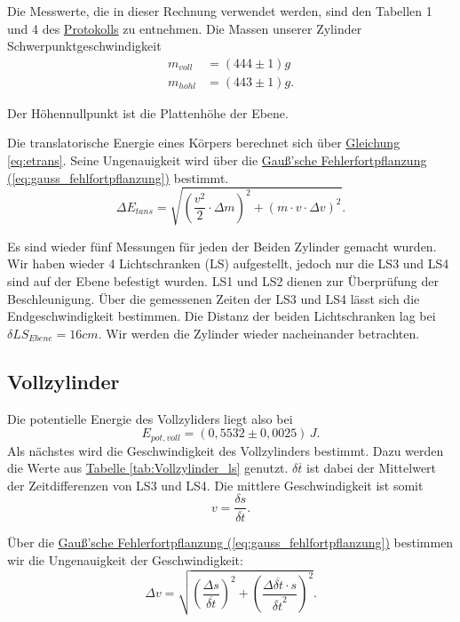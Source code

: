 Die Messwerte, die in dieser Rechnung verwendet werden, sind den Tabellen 1 und 4 des \hyperref[Protokoll]{Protokolls} zu entnehmen. Die Massen unserer Zylinder Schwerpunktgeschwindigkeit
\begin{align}
    m_{voll} &= (444 \pm 1) g \\
    m_{hohl} &= (443 \pm 1) g.
\end{align}



Der Höhennullpunkt ist die Plattenhöhe der Ebene.

Die translatorische Energie eines Körpers berechnet sich über \hyperref[eq:etrans]{Gleichung \ref*{eq:etrans}}. Seine Ungenauigkeit wird über die \hyperref[eq:gauss_fehlfortpflanzung]{Gauß'sche Fehlerfortpflanzung (\ref*{eq:gauss_fehlfortpflanzung})} bestimmt.
\begin{equation}
    \Delta E_{tans} = \sqrt{\left(\frac{v^2}{2} \cdot \Delta m\right)^2 + \left(m\cdot v \cdot \Delta v \right)^2}.
\end{equation}

Es sind wieder fünf Messungen für jeden der Beiden Zylinder gemacht wurden. Wir haben wieder 4 Lichtschranken (LS) aufgestellt, jedoch nur die LS3 und LS4 sind auf der Ebene befestigt wurden. LS1 und LS2 dienen zur Überprüfung der Beschleunigung. Über die gemessenen Zeiten der LS3 und LS4 lässt sich die Endgeschwindigkeit bestimmen. Die Distanz der beiden Lichtschranken lag bei $\delta LS_{Ebene} = 16 cm$. Wir werden die Zylinder wieder nacheinander betrachten.

\subsection*{Vollzylinder}
Die potentielle Energie des Vollzyliders liegt also bei 
\begin{equation}
\boxed{
    E_{pot,voll} = (0,5532 \pm 0,0025)\, J
}.
\end{equation}
Als nächstes wird die Geschwindigkeit des Vollzylinders bestimmt. Dazu werden die Werte aus \hyperref[tab:Vollzylinder_ls]{Tabelle \ref*{tab:Vollzylinder_ls}} genutzt. $\delta\overline{t}$ ist dabei der Mittelwert der Zeitdifferenzen von LS3 und LS4. Die mittlere Geschwindigkeit ist somit
\begin{equation}
    v = \frac{\delta s}{\overline{\delta t}}.
\end{equation}

Über die \hyperref[eq:gauss_fehlfortpflanzung]{Gauß'sche Fehlerfortpflanzung (\ref*{eq:gauss_fehlfortpflanzung})} bestimmen wir die Ungenauigkeit der Geschwindigkeit:
\begin{equation}
    \Delta v =  \sqrt{\left(\frac{\Delta s}{\overline{\delta t}}\right)^2 +\left(\frac{\Delta \overline{\delta t} \cdot s}{\overline{\delta t} ^2}\right)^2}.
\end{equation}

